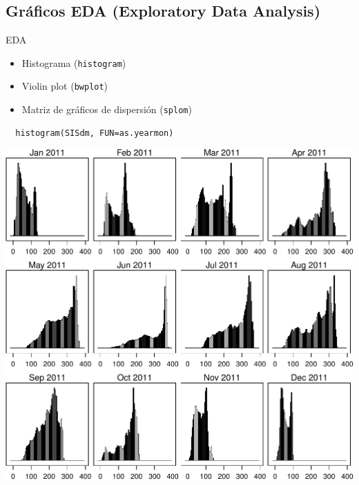\documentclass[xcolor={usenames,svgnames,dvipsnames}]{beamer}
\begin{document}
\subsection{Gráficos EDA (Exploratory Data Analysis)}
\label{sec-4-3}

\begin{frame}[fragile,label=sec-4-3-1]{EDA}
 \begin{itemize}
\item Histograma (\texttt{histogram})
\item Violin plot (\texttt{bwplot})
\item Matriz de gráficos de dispersión (\texttt{splom})
\end{itemize}
\end{frame}

\begin{frame}[fragile,label=sec-4-3-2]{}
 \lstset{language=R,label= ,caption= ,numbers=none}
\begin{lstlisting}
  histogram(SISdm, FUN=as.yearmon)
\end{lstlisting}

\includegraphics[width=.9\linewidth]{figs/SISdm_histogram.pdf}
\end{frame}
\end{document}

